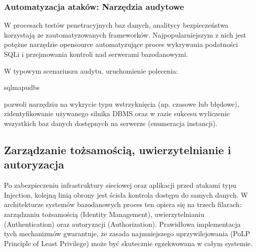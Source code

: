 \documentclass[letterpaper,10pt,polish]{sphinxmanual}
\begin{document}
\subsubsection{Automatyzacja ataków: Narzędzia audytowe}
\label{\detokenize{rozdzia_u0142_2/rozdzia_u0142_27/rozdzial_2:automatyzacja-atakow-narzedzia-audytowe}}
\sphinxAtStartPar
W procesach testów penetracyjnych baz danych, analitycy bezpieczeństwa korzystają ze zautomatyzowanych frameworków. Najpopularniejszym z nich jest  \textendash{} potężne narzędzie open\sphinxhyphen{}source automatyzujące proces wykrywania podatności SQLi i przejmowania kontroli nad serwerami bazodanowymi.

\sphinxAtStartPar
W typowym scenariuszu audytu, uruchomienie polecenia:

\begin{sphinxVerbatim}[commandchars=\\\{\}]
sqlmap\PYGZhy{}u\PYGZhy{}\PYGZhy{}dbs
\end{sphinxVerbatim}

\sphinxAtStartPar
pozwoli narzędziu na wykrycie typu wstrzyknięcia (np. czasowe lub błędowe), zidentyfikowanie używanego silnika DBMS oraz \textendash{} w razie sukcesu \textendash{} wyliczenie wszystkich baz danych dostępnych na serwerze (enumeracja instancji).

\sphinxstepscope


\subsection{Zarządzanie tożsamością, uwierzytelnianie i autoryzacja}
\label{\detokenize{rozdzia_u0142_2/rozdzia_u0142_27/rozdzial_3:zarzadzanie-tozsamoscia-uwierzytelnianie-i-autoryzacja}}\label{\detokenize{rozdzia_u0142_2/rozdzia_u0142_27/rozdzial_3::doc}}
\sphinxAtStartPar
Po zabezpieczeniu infrastruktury sieciowej oraz aplikacji przed atakami typu Injection, kolejną linią obrony jest ścisła kontrola dostępu do samych danych. W architekturze systemów bazodanowych proces ten opiera się na trzech filarach: zarządzaniu tożsamością (Identity Management), uwierzytelnianiu (Authentication) oraz autoryzacji (Authorization). Prawidłowa implementacja tych mechanizmów gwarantuje, że zasada najmniejszego uprzywilejowania (PoLP \sphinxhyphen{} Principle of Least Privilege) może być skutecznie egzekwowana w całym systemie.
\end{document}
